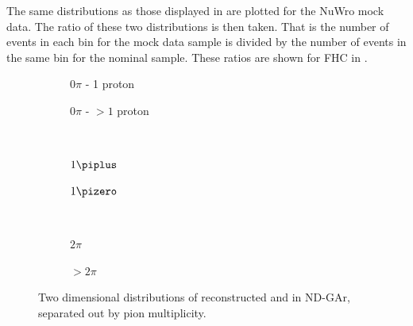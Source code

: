 The same distributions as those displayed in  are plotted for the NuWro mock data.
The ratio of these two distributions is then taken.
That is the number of events in each bin for the mock data sample is divided by the number of events in the same bin for the nominal sample.
These ratios are shown for FHC in .

\begin{figure}[t]
	\begin{subfigure}[t]{.5\linewidth}
		\begin{adjustbox}{max totalsize=\linewidth, center}
			
		\end{adjustbox}
		\caption{$0\pi$ - 1 proton}
	\end{subfigure}
	\hfill
	\begin{subfigure}[t]{.5\linewidth}
		\begin{adjustbox}{max totalsize=\linewidth, center}
			
		\end{adjustbox}
		\caption{$0\pi$ - $>1$ proton}
	\end{subfigure} \\
	\begin{subfigure}[t]{.5\linewidth}
		\begin{adjustbox}{max totalsize=\linewidth, center}
			
		\end{adjustbox}
		\caption{$1\piplus$}
	\end{subfigure}
	\hfill
	\begin{subfigure}[t]{.5\linewidth}
		\begin{adjustbox}{max totalsize=\linewidth, center}
			
		\end{adjustbox}
		\caption{$1\pizero$}
	\end{subfigure} \\
	\begin{subfigure}[t]{.5\linewidth}
		\begin{adjustbox}{max totalsize=\linewidth, center}
			
		\end{adjustbox}
		\caption{$2\pi$}
	\end{subfigure}
	\hfill
	\begin{subfigure}[t]{.5\linewidth}
		\begin{adjustbox}{max totalsize=\linewidth, center}
			
		\end{adjustbox}
		\caption{$>2\pi$}
	\end{subfigure}
	\caption[Two dimensional distributions of \evis and \pvis in ND-GAr]{Two dimensional distributions of reconstructed \evis and \pvis in ND-GAr, separated out by pion multiplicity.}
	\label{fig:q0q3RatioFhc}
\end{figure}

